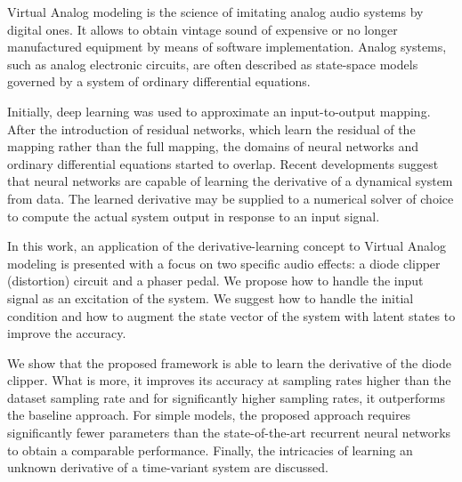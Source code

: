Virtual Analog modeling is the science of imitating analog audio systems by digital ones. It allows to obtain vintage sound of expensive or no longer manufactured equipment by means of software implementation. Analog systems, such as analog electronic circuits, are often described as state-space models governed by a system of ordinary differential equations. 

Initially, deep learning was used to approximate an input-to-output mapping. After the introduction of residual networks, which learn the residual of the mapping rather than the full mapping, the domains of neural networks and ordinary differential equations started to overlap. Recent developments suggest that neural networks are capable of learning the derivative of a dynamical system from data. The learned derivative may be supplied to a numerical solver of choice to compute the actual system output in response to an input signal. 

In this work, an application of the derivative-learning concept to Virtual Analog modeling is presented with a focus on two specific audio effects: a diode clipper (distortion) circuit and a phaser pedal. We propose how to handle the input signal as an excitation of the system. We suggest how to handle the initial condition and how to augment the state vector of the system with latent states to improve the accuracy.

We show that the proposed framework is able to learn the derivative of the diode clipper. What is more, it improves its accuracy at sampling rates higher than the dataset sampling rate and for significantly higher sampling rates, it outperforms the baseline approach. For simple models, the proposed approach requires significantly fewer parameters than the state-of-the-art recurrent neural networks to obtain a comparable performance. Finally, the intricacies of learning an unknown derivative of a time-variant system are discussed.
